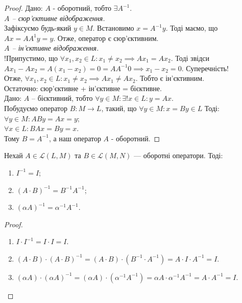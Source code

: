 \documentclass{math_library}
\begin{document}
	\begin{proof}
	\rightproof Дано: $A$ - оборотний, тобто $\exists A^{-1}$.\\
	\textit{$A$ -- сюр'єктивне відображення.}\\
	Зафіксуємо будь-який $y \in M$. Встановимо $x = A^{-1}y$. Тоді маємо, що $Ax = AA^{1}y = y$. Отже, оператор є сюр'єктивним.\\
	\textit{$A$ -- ін'єктивне відображення.}\\
	!Припустимо, що $\forall x_1,x_2 \in L: x_1 \neq x_2 \implies Ax_1 = Ax_2$. Тоді звідси $Ax_1 - Ax_2 = A(x_1-x_2)=0=AA^{-1}0 \implies x_1 - x_2 = 0$. Суперечність! \\
	Отже, $\forall x_1,x_2 \in L: x_1 \neq x_2 \implies Ax_1 \neq Ax_2$. Тобто є ін'єктивним.\\
	Остаточно: сюр'єктивне + ін'єктивне = бієктивне.
	\bigskip \\
	\leftproof Дано: $A$ -- бієктивний, тобто $\forall y \in M: \exists! x \in L: y=  Ax$.\\
	Побудуємо оператор $B \colon M \to L$, такий, що $\forall y \in M: x = By \in L$ Тоді:\\
	$\forall y \in M: ABy = Ax = y$;\\
	$\forall x \in L: BAx = By = x$.\\
	Тому $B = A^{-1}$, а наш оператор $A$ - оборотний.
	\end{proof}
\fi
	
	\begin{proposition}
	Нехай $A \in \mathcal{L}(L,M)$ та $B \in \mathcal{L}(M,N)$ --- оборотні оператори. Тоді:
	\begin{enumerate}[nosep, wide=0pt, label={\arabic*)}]
	\item $I^{-1} = I$;
	\item $(A \cdot B)^{-1} = B^{-1} A^{-1}$;
	\item $(\alpha A)^{-1} = \alpha^{-1} A^{-1}$.
	\end{enumerate}
	\end{proposition}
	
	\begin{proof}
	\begin{enumerate}[nosep,, wide=0pt, label={\arabic*)}]
	\item $I \cdot I^{-1} = I \cdot I = I$.
	\item $(A \cdot B) \cdot (A \cdot B)^{-1} = (A \cdot B) \cdot (B^{-1} \cdot A^{-1}) = A \cdot I \cdot A^{-1} = I$.
	\item $(\alpha A) \cdot (\alpha A)^{-1} = (\alpha A) \cdot (\alpha^{-1} A^{-1}) = \alpha A \cdot \alpha^{-1} A^{-1} = A \cdot A^{-1} = I$. \qedhere
	\end{enumerate}
	\end{proof}
	
\end{document}
